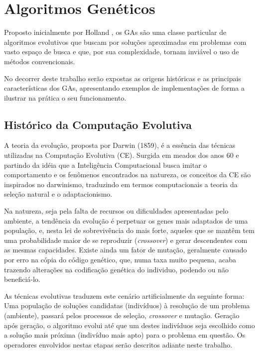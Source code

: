 \chapter{Algoritmos Genéticos\label{cap:ga}}


Proposto inicialmente por Holland \cite{Holland}, os GAs são uma classe particular de algoritmos evolutivos que buscam por soluções aproximadas em problemas com vasto espaço de busca e que, por sua complexidade, tornam inviável o uso de métodos convencionais.
	
	No decorrer deste trabalho serão expostas as origens históricas e as principais características dos GAs, apresentando exemplos de implementações de forma a ilustrar na prática o seu funcionamento.

 \section{Histórico da Computação Evolutiva}
 
A teoria da evolução, proposta por Darwin (1859), é a essência das técnicas utilizadas na Computação Evolutiva (CE). Surgida em meados dos anos 60 e partindo da idéia que a Inteligência Computacional busca imitar o comportamento e os fenômenos encontrados na natureza, os conceitos da CE são inspirados no darwinismo, traduzindo em termos computacionais a teoria da seleção natural e o adaptacionismo.

Na natureza, seja pela falta de recursos ou dificuldades apresentadas pelo ambiente, a tendência da evolução é perpetuar os genes mais adaptados de uma população, e, nesta lei de sobrevivência do mais forte, aqueles que se mantêm tem uma probabilidade maior de se reproduzir (\textit{crossover}) e gerar descendentes com as mesmas capacidades. Existe ainda um fator de mutação, geralmente causado por erro na cópia do código genético, que, numa taxa muito pequena, acaba trazendo alterações na codificação genética do individuo, podendo ou não beneficiá-lo.

As técnicas evolutivas traduzem este cenário artificialmente da seguinte forma: Uma população de soluções candidatas (indivíduos) à resolução de um problema (ambiente), passará pelos processos de seleção, \textit{crossover} e mutação. Geração após geração, o algoritmo evolui até que um destes indivíduos seja escolhido como a solução mais próxima (indivíduo mais apto) para o problema em questão. Os operadores envolvidos nestas etapas serão descritos adiante neste trabalho.

